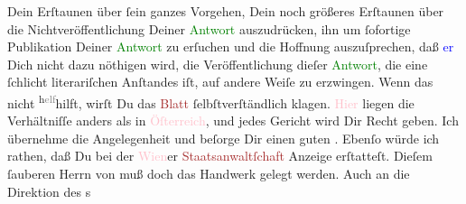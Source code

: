                Dein Erſtaunen über ſein ganzes Vorgehen, Dein noch größeres Erſtaunen über  die Nichtveröffentlichung Deiner \textcolor{green}{Antwort}{}\ledrightnote{{$\rightarrow$}\textcolor{green}{Das angebliche Telegramm Arthur Schnitzlers}} auszudrücken, ihn um ſofortige
               Publikation Deiner \textcolor{green}{Antwort}{}\ledrightnote{{$\rightarrow$}\textcolor{green}{Das angebliche Telegramm Arthur Schnitzlers}} zu
               erſuchen und die Hoffnung auszuſprechen, daß {\pb}\textcolor{blue}{er}{}\ledrightnote{{$\rightarrow$}\textcolor{blue}{Karl Strecker}} Dich nicht dazu nöthigen
               wird, die Veröffentlichung dieſer \textcolor{green}{Antwort}{}\ledrightnote{{$\rightarrow$}\textcolor{green}{Das angebliche Telegramm Arthur Schnitzlers}}, die eine ſchlicht literariſchen Anſtandes iſt, auf andere Weiſe zu
               erzwingen. Wenn das nicht \substVorne{}\textsuperscript{h\textcolor{gray}{elf}}\substDazwischen{}hilft\substHinten{}, wirſt Du das \textcolor{brown}{Blatt}{}\ledrightnote{{$\rightarrow$}\textcolor{brown}{Tägliche Rundschau}}
               ſelbſtverſtändlich klagen. \textcolor{pink}{Hier}{}\ledrightnote{{$\rightarrow$}\textcolor{pink}{Deutschland}}
               liegen die Verhältniſſe anders als in \textcolor{pink}{Öſterreich}{}\ledrightnote{\textcolor{pink}{Österreich}}, und jedes Gericht wird Dir Recht geben. Ich übernehme die
               Angelegenheit und beſorge Dir einen guten \label{K_L03205-12v}\label{K_L03205-12h}. Ebenſo würde ich rathen, daß Du bei der \textcolor{pink}{Wien}{}\ledrightnote{\textcolor{pink}{Wien}}er \textcolor{brown}{Staatsanwaltſchaft}{}\ledrightnote{\textcolor{brown}{Staatsanwaltschaft}} Anzeige erſtatteſt. Dieſem ſauberen Herrn von \label{K_L03205-5v}\label{K_L03205-5h} muß
               doch das Handwerk gelegt werden. Auch an die {\pb}Direktion des \label{K_L03205-6v}\label{K_L03205-6h}s
